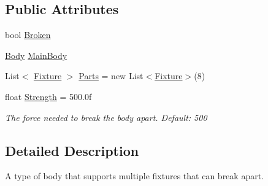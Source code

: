 \subsection*{Public Attributes}
\begin{DoxyCompactItemize}
\item 
bool \hyperlink{class_farseer_physics_1_1_dynamics_1_1_breakable_body_a16ad5811f16ea5710b06b5c1f99ae29a}{Broken}
\item 
\hyperlink{class_farseer_physics_1_1_dynamics_1_1_body}{Body} \hyperlink{class_farseer_physics_1_1_dynamics_1_1_breakable_body_a4b9f2642b0aa11a4ef658a90b323c314}{Main\+Body}
\item 
List$<$ \hyperlink{class_farseer_physics_1_1_dynamics_1_1_fixture}{Fixture} $>$ \hyperlink{class_farseer_physics_1_1_dynamics_1_1_breakable_body_a2a80b7144e2c9e8e22e47dfdcd3615d7}{Parts} = new List$<$\hyperlink{class_farseer_physics_1_1_dynamics_1_1_fixture}{Fixture}$>$(8)
\item 
float \hyperlink{class_farseer_physics_1_1_dynamics_1_1_breakable_body_a313f8f8c6e68a48af90c79925a2ad41d}{Strength} = 500.\+0f
\begin{DoxyCompactList}\small\item\em The force needed to break the body apart. Default\+: 500 \end{DoxyCompactList}\end{DoxyCompactItemize}


\subsection{Detailed Description}
A type of body that supports multiple fixtures that can break apart. 



